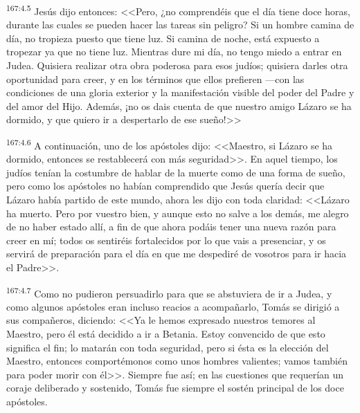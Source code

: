 \par 
\textsuperscript{167:4.5} Jesús dijo entonces: <<Pero, ¿no comprendéis que el día tiene doce horas, durante las cuales se pueden hacer las tareas sin peligro? Si un hombre camina de día, no tropieza puesto que tiene luz. Si camina de noche, está expuesto a tropezar ya que no tiene luz. Mientras dure mi día, no tengo miedo a entrar en Judea. Quisiera realizar otra obra poderosa para esos judíos; quisiera darles otra oportunidad para creer, y en los términos que ellos prefieren ---con las condiciones de una gloria exterior y la manifestación visible del poder del Padre y del amor del Hijo. Además, ¡no os dais cuenta de que nuestro amigo Lázaro se ha dormido, y que quiero ir a despertarlo de ese sueño!>>

\par 
\textsuperscript{167:4.6} A continuación, uno de los apóstoles dijo: <<Maestro, si Lázaro se ha dormido, entonces se restablecerá con más seguridad>>. En aquel tiempo, los judíos tenían la costumbre de hablar de la muerte como de una forma de sueño, pero como los apóstoles no habían comprendido que Jesús quería decir que Lázaro había partido de este mundo, ahora les dijo con toda claridad: <<Lázaro ha muerto. Pero por vuestro bien, y aunque esto no salve a los demás, me alegro de no haber estado allí, a fin de que ahora podáis tener una nueva razón para creer en mí; todos os sentiréis fortalecidos por lo que vais a presenciar, y os servirá de preparación para el día en que me despediré de vosotros para ir hacia el Padre>>.

\par 
\textsuperscript{167:4.7} Como no pudieron persuadirlo para que se abstuviera de ir a Judea, y como algunos apóstoles eran incluso reacios a acompañarlo, Tomás se dirigió a sus compañeros, diciendo: <<Ya le hemos expresado nuestros temores al Maestro, pero él está decidido a ir a Betania. Estoy convencido de que esto significa el fin; lo matarán con toda seguridad, pero si ésta es la elección del Maestro, entonces comportémonos como unos hombres valientes; vamos también para poder morir con él>>. Siempre fue así; en las cuestiones que requerían un coraje deliberado y sostenido, Tomás fue siempre el sostén principal de los doce apóstoles.

